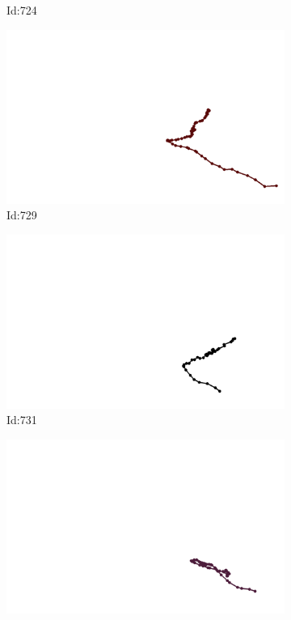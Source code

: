 \documentclass[12pt,twoside]{report}
\begin{document}
\begin{figure}
\begin{subfigure}[b]{0.20\textwidth}
\caption{Id:724}
\end{subfigure}
\begin{subfigure}[b]{0.20\textwidth}
\centering
\includegraphics[width=\textwidth]{../trajectories/729.png}
\caption{Id:729}
\end{subfigure}
\begin{subfigure}[b]{0.20\textwidth}
\centering
\includegraphics[width=\textwidth]{../trajectories/731.png}
\caption{Id:731}
\end{subfigure}
\begin{subfigure}[b]{0.20\textwidth}
\centering
\includegraphics[width=\textwidth]{../trajectories/760.png}

\end{subfigure}
\end{figure}
\end{document}

